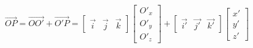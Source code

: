 \documentclass{article}
\begin{document}
\thispagestyle{empty}

$$
\overrightarrow{OP} = \overrightarrow{OO'} + \overrightarrow{O'P} = 
\begin{bmatrix}\vec{i} & \vec{j} & \vec{k}\end{bmatrix}
\begin{bmatrix}O'_x \\ O'_y \\ O'_z\end{bmatrix} + 
\begin{bmatrix}\vec{i'} & \vec{j'} & \vec{k'}\end{bmatrix} 
\begin{bmatrix}x' \\ y' \\ z'\end{bmatrix} 
$$
\end{document}
